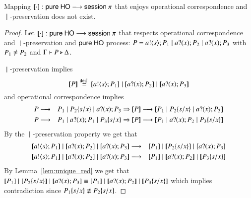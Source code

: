 \begin{theorem}
	Mapping $[\!\![\cdot]\!\!]: \mathsf{pure\ HO} \longrightarrow \mathsf{session\ }\pi$ that enjoys
	operational correspondence and $\;|\;$-preservation does not
	exist.
\end{theorem}

\begin{proof}
	Let $[\!\![\cdot]\!\!]: \mathsf{pure\ HO} \longrightarrow \mathsf{session\ }\pi$ that respects
	operational correspondence and $\;|\;$-preservation and
	$\mathsf{pure\ HO}$ process:
	$P = a ! \langle s \rangle ; P_1 \;|\; a ? (x) ; P_2 \;|\; a ? (x) ; P_3$
	with $P_1 \not\scong P_2$ and $\Gamma \vdash P \triangleright \Delta$.

	$\;|\;$-preservation implies
	\[
		\map{P} \defeq \map{\bout{a}{s} P_1} \Par \map{\binp{a}{x} P_2} \Par \map{\binp{a}{x} P_3}
	\]
%
	and operational correspondence implies
%
	\begin{eqnarray}
		P &\red& P_1 \Par P_2 \subst{s}{x} \Par \binp{a}{x} P_3 \Rightarrow \map{P} \red \map{P_1 \Par P_2 \subst{s}{x} \Par \binp{a}{x} P_3} \\
		P &\red& P_1 \Par \binp{a}{x} P_1 \Par P_3 \subst{s}{x} \Rightarrow \map{P} \red \map{P_1 \Par \binp{a}{x} P_2 \Par P_3 \subst{s}{x}}
	\end{eqnarray}
%
	By the $\;|\;$-preservation property we get that
%
	\begin{eqnarray}
		\map{\bout{a}{s} P_1} \Par \map{\binp{a}{x} P_2} \Par \map{\binp{a}{x} P_3} &\red& \map{P_1} \Par \map{P_2 \subst{s}{x}} \Par \map{\binp{a}{x} P_3} \\
		\map{\bout{a}{s} P_1} \Par \map{\binp{a}{x} P_2} \Par \map{\binp{a}{x} P_3} &\red& \map{P_1} \Par \map{\binp{a}{x} P_2} \Par \map{P_3 \subst{s}{x}}
	\end{eqnarray}
%
	By Lemma~\ref{lem:unique_red} we get that
	$\map{P_1} \Par \map{P_2 \subst{s}{x}} \Par \map{\binp{a}{x} P_3} \scong \map{P_1} \Par \map{\binp{a}{x} P_2} \Par \map{P_3 \subst{s}{x}}$
	which implies contradiction since $P_1 \subst{s}{x} \not\scong P_2 \subst{s}{x}$.
\end{proof}
